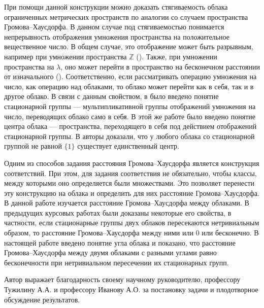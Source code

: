 При помощи данной конструкции можно доказать стягиваемость облака
ограниченных
метрических пространств по аналогии со случаем пространства Громова--Хаусдорфа.
В данном случае под стягиваемостью понимается непрерывность отображения
умножения пространства на положительное вещественное число.
В общем случае, это отображение может быть разрывным, например при умножении
пространства \( \mathbb{Z} \)
(\cite{mikhailov2025newgeodesiclinesgromovhausdorff}). Также, при умножении
пространства на \( \lambda \), оно может перейти в пространство на
бесконечном расстоянии от изначального (\cite{TuzhBog1}). Соответственно,
если рассматривать операцию умножения на число, как операцию над облаками, то
облако может перейти как в себя, так и в другое облако. В связи с данным
свойством, в
\cite{TuzhBog2} было введено понятие стационарной группы --- мультипликативной
группы отображений умножения на число, переводящих облако само в себя. В этой
же работе было введено понятие центра облака --- пространства, переходящего в
себя под действием отображений стационарной группы. В \cite{TuzhBog2} авторы
доказали, что у любого облака со стационарной группой не равной \( \{1\} \)
существует единственный центр.

Одним из способов задания расстояния Громова--Хаусдорфа является конструкция
соответствий. При этом, для задания соответствия не обязательно, чтобы
классы, между которыми оно определяется были множествами. Это позволяет
перенести эту конструкцию на облака и определить для них расстояние
Громова--Хаусдорфа. В данной работе изучается расстояние Громова--Хаусдорфа
между облаками. В предыдущих курсовых работах были доказаны некоторые его
свойства, в частности, если стационарные группы двух облаков пересекаются
нетривиальным образом, то расстояние Громова--Хаусдорфа между ними или \( 0
\) или бесконечно. В настоящей работе введено понятие угла облака и показано,
что расстояние Громова--Хаусдорфа между двумя облаками с разными углами равно
бесконечности при нетривиальном пересечении их стационарных групп.

Автор выражает благодарность своему научному руководителю, профессору
Тужилину А.А. и профессору Иванову А.О. за постановку задачи и плодотворное
обсуждение результатов.

